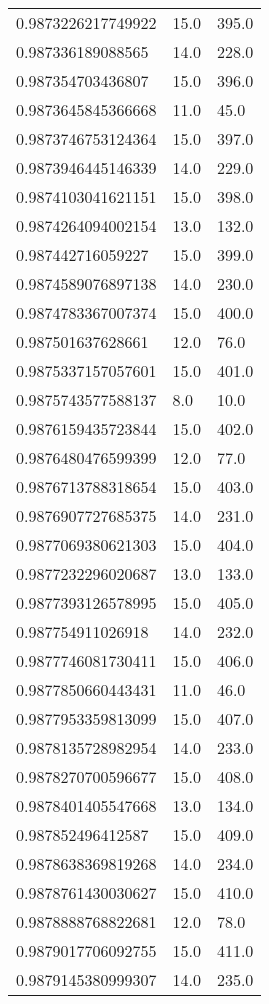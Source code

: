 \begin{center}
\begin{supertabular}[H]{p{0.30\textwidth}p{0.05\textwidth}p{0.05\textwidth}}
0.9873226217749922 & 15.0 & 395.0 \\ 
0.987336189088565 & 14.0 & 228.0 \\ 
0.987354703436807 & 15.0 & 396.0 \\ 
0.9873645845366668 & 11.0 & 45.0 \\ 
0.9873746753124364 & 15.0 & 397.0 \\ 
0.9873946445146339 & 14.0 & 229.0 \\ 
0.9874103041621151 & 15.0 & 398.0 \\ 
0.9874264094002154 & 13.0 & 132.0 \\ 
0.987442716059227 & 15.0 & 399.0 \\ 
0.9874589076897138 & 14.0 & 230.0 \\ 
0.9874783367007374 & 15.0 & 400.0 \\ 
0.987501637628661 & 12.0 & 76.0 \\ 
0.9875337157057601 & 15.0 & 401.0 \\ 
0.9875743577588137 & 8.0 & 10.0 \\ 
0.9876159435723844 & 15.0 & 402.0 \\ 
0.9876480476599399 & 12.0 & 77.0 \\ 
0.9876713788318654 & 15.0 & 403.0 \\ 
0.9876907727685375 & 14.0 & 231.0 \\ 
0.9877069380621303 & 15.0 & 404.0 \\ 
0.9877232296020687 & 13.0 & 133.0 \\ 
0.9877393126578995 & 15.0 & 405.0 \\ 
0.987754911026918 & 14.0 & 232.0 \\ 
0.9877746081730411 & 15.0 & 406.0 \\ 
0.9877850660443431 & 11.0 & 46.0 \\ 
0.9877953359813099 & 15.0 & 407.0 \\ 
0.9878135728982954 & 14.0 & 233.0 \\ 
0.9878270700596677 & 15.0 & 408.0 \\ 
0.9878401405547668 & 13.0 & 134.0 \\ 
0.987852496412587 & 15.0 & 409.0 \\ 
0.9878638369819268 & 14.0 & 234.0 \\ 
0.9878761430030627 & 15.0 & 410.0 \\ 
0.9878888768822681 & 12.0 & 78.0 \\ 
0.9879017706092755 & 15.0 & 411.0 \\ 
0.9879145380999307 & 14.0 & 235.0 \\ 

\end{supertabular}
\end{center}
